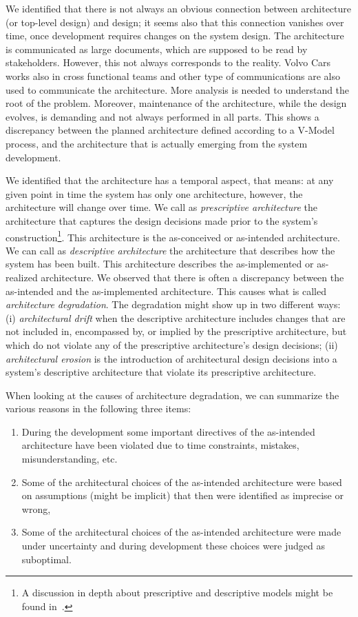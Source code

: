 We identified that there is not always an obvious connection between  
architecture (or top-level design) and  design; it seems also that this connection vanishes over time, once development requires changes on the system design. %
The architecture is communicated as large documents,
which are supposed to be read by stakeholders. However, this not always corresponds to the reality. Volvo Cars works also in cross functional teams and other type of communications are also used to communicate the architecture. More analysis is needed to understand the root of the problem. 
Moreover, maintenance of the
architecture, while the design evolves, is demanding and not
always performed in all parts. 
This shows a discrepancy between the planned architecture defined according to a V-Model process, and the architecture that is actually emerging from the system development. 

We identified that the architecture has a temporal aspect, that means: at any given point in time the system
has only one architecture, however, the architecture will change over time.
We call as {\em prescriptive architecture} the architecture that captures
the design decisions made prior to the system's construction\footnote{A discussion in depth about prescriptive and descriptive models might be found in~\cite{Models2016}.}. This architecture is the as-conceived or as-intended architecture.
We can call as {\em descriptive architecture} the architecture that describes how the system has been built. This architecture describes the as-implemented or as-realized architecture. We observed that there is often a discrepancy between the as-intended and the as-implemented architecture. This causes what is called {\em architecture degradation}. The degradation might show up in two different ways: (i) {\em architectural drift} when the descriptive architecture includes changes that are not included in, encompassed by, or implied by the
prescriptive architecture, but which do not violate any of the prescriptive architecture's
design decisions; (ii) {\em architectural erosion} is the introduction of
architectural design decisions into a system's descriptive architecture that violate its prescriptive
architecture.
 
When looking at the causes of architecture degradation, we can summarize the various reasons in the following three items: 

\begin{enumerate} 
\item During the development some important directives of the as-intended architecture have been violated due to time constraints, mistakes, misunderstanding, etc. 
\item Some of the architectural choices of the as-intended architecture were based on assumptions (might be implicit) that then were identified as imprecise or wrong, 
\item Some of the architectural choices of the as-intended architecture were made under uncertainty and during development these choices were judged as suboptimal.
\end{enumerate}


